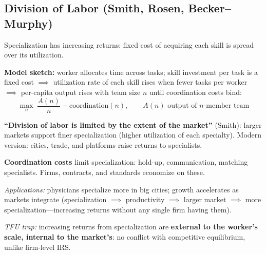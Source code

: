 \subsection{Division of Labor (Smith, Rosen, Becker--Murphy)}
Specialization has increasing returns: fixed cost of acquiring each skill is spread over its utilization.

\textbf{Model sketch:} worker allocates time across tasks; skill investment per task is a fixed cost $\implies$ utilization rate of each skill rises when fewer tasks per worker $\implies$ per-capita output rises with team size $n$ until coordination costs bind:
$$\max_n \; \frac{A(n)}{n} - \text{coordination}(n), \qquad A(n) \text{ output of } n\text{-member team}$$

\textbf{``Division of labor is limited by the extent of the market''} (Smith): larger markets support finer specialization (higher utilization of each specialty). Modern version: cities, trade, and platforms raise returns to specialists.

\textbf{Coordination costs} limit specialization: hold-up, communication, matching specialists. Firms, contracts, and standards economize on these.

\textit{Applications:} physicians specialize more in big cities; growth accelerates as markets integrate (specialization $\implies$ productivity $\implies$ larger market $\implies$ more specialization---increasing returns without any single firm having them).

\textit{TFU trap:} increasing returns from specialization are \textbf{external to the worker's scale, internal to the market's}: no conflict with competitive equilibrium, unlike firm-level IRS.

